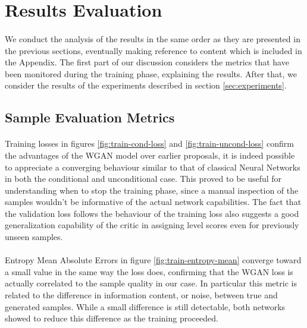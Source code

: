 \section{Results Evaluation}
\label{sec:results-evaluation}
\paragraph{} We conduct the analysis of the results in the same order as they are presented in the previous sections, eventually making reference to content which is included in the Appendix. The first part of our discussion considers the metrics that have been monitored during the training phase, explaining the results. After that, we consider the results of the experiments described in section \ref{sec:experiments}.
\subsection{Sample Evaluation Metrics}
\paragraph{} Training losses in figures \ref{fig:train-cond-loss} and \ref{fig:train-uncond-loss} confirm the advantages of the WGAN model over earlier proposals, it is indeed possible to appreciate a converging behaviour similar to that of classical Neural Networks in both the conditional and unconditional case. This proved to be useful for understanding when to stop the training phase, since a manual inspection of the samples wouldn't be informative of the actual network capabilities. The fact that the validation loss follows the behaviour of the training loss also suggests a good generalization capability of the critic in assigning level scores even for previously unseen samples. 

\paragraph{} Entropy Mean Absolute Errors in figure \ref{fig:train-entropy-mean} converge toward a small value in the same way the loss does, confirming that the WGAN loss is actually correlated to the sample quality in our case. In particular this metric is related to the difference in information content, or noise, between true and generated samples. While a small difference is still detectable, both networks showed to reduce this difference as the training proceeded.

